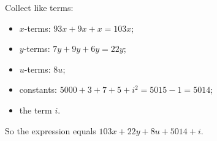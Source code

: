 Collect like terms:
\begin{itemize}
\item $x$-terms: $93x+9x+x=103x$;
\item $y$-terms: $7y+9y+6y=22y$;
\item $u$-terms: $8u$;
\item constants: $5000+3+7+5+i^2=5015-1=5014$;
\item the term $i$.
\end{itemize}
So the expression equals $\boxed{103x+22y+8u+5014+i}$.
